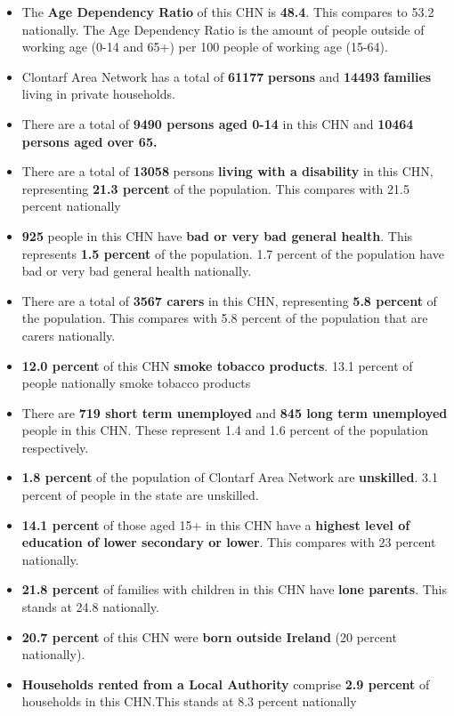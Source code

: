\documentclass{article}
\begin{document}
\begin{itemize}

\item The \textbf{Age Dependency Ratio} of this CHN is  \textbf{48.4}. This compares to 53.2 nationally. The Age Dependency Ratio is the amount of people outside of working age (0-14 and 65+) per 100 people of working age (15-64). 

\item Clontarf Area Network has a total of \textbf{\num{61177}} \textbf{persons} and  \textbf{\num{14493}} \textbf{families} living in private households.

\item There are a total of \textbf{\num{9490} persons aged 0-14} in this CHN and \textbf{\num{10464} persons aged over 65.} 

\item There are a total of \textbf{\num{13058}} persons \textbf{living with a disability} in this CHN, representing \textbf{21.3 percent} of the population. This compares with  21.5 percent nationally

\item \textbf{\num{925}} people in this CHN have \textbf{bad or very bad general health}. This represents \textbf{1.5 percent} of the population. 1.7 percent of the population have bad or very bad general health nationally. 

\item There are a total of \textbf{\num{3567} carers} in this CHN, representing \textbf{5.8 percent} of the population. This compares with 5.8 percent of the population that are carers nationally. 

\item \textbf{12.0 percent} of this CHN \textbf{smoke tobacco products}. 13.1 percent of people nationally smoke tobacco products

\item There are \textbf{\num{719} short term unemployed} and \textbf{\num{845} long term unemployed} people in this CHN. These represent 1.4 and 1.6 percent of the population respectively.

\item  \textbf{1.8 percent} of the population of Clontarf Area Network are \textbf{unskilled}. 3.1 percent of people in the state are unskilled.

\item \textbf{14.1 percent} of those aged 15+ in this CHN have a \textbf{highest level of education of lower secondary or lower}. This compares with 23 percent nationally. 

\item \textbf{21.8 percent} of families with children in this CHN have \textbf{lone parents}. This stands at 24.8 nationally.

\item \textbf{20.7 percent} of this CHN were \textbf{born outside Ireland} (20 percent nationally).

\item \textbf{Households rented from a Local Authority} comprise \textbf{2.9 percent} of households in this CHN.This stands at 8.3 percent nationally

\end{itemize}
\end{document}
